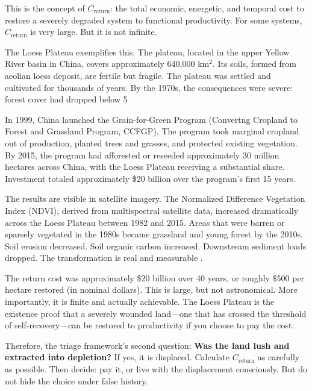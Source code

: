 \documentclass[12pt,a4paper]{article}
\begin{document}
This is the concept of $C_{\text{return}}$: the total economic, energetic, and temporal cost to restore a severely degraded system to functional productivity. For some systems, $C_{\text{return}}$ is very large. But it is not infinite.

The Loess Plateau exemplifies this. The plateau, located in the upper Yellow River basin in China, covers approximately 640,000 km$^2$. Its soils, formed from aeolian loess deposit, are fertile but fragile. The plateau was settled and cultivated for thousands of years. By the 1970s, the consequences were severe: forest cover had dropped below 5%

In 1999, China launched the Grain-for-Green Program (Convertng Cropland to Forest and Grassland Program, CCFGP). The program took marginal cropland out of production, planted trees and grasses, and protected existing vegetation. By 2015, the program had afforested or reseeded approximately 30 million hectares across China, with the Loess Plateau receiving a substantial share. Investment totaled approximately \$20 billion over the program's first 15 years.

The results are visible in satellite imagery. The Normalized Difference Vegetation Index (NDVI), derived from multispectral satellite data, increased dramatically across the Loess Plateau between 1982 and 2015. Areas that were barren or sparsely vegetated in the 1980s became grassland and young forest by the 2010s. Soil erosion decreased. Soil organic carbon increased. Downstream sediment loads dropped. The transformation is real and measurable \citep{Feng:2016, Tucker:1991}.

The return cost was approximately \$20 billion over 40 years, or roughly \$500 per hectare restored (in nominal dollars). This is large, but not astronomical. More importantly, it is finite and actually achievable. The Loess Plateau is the existence proof that a severely wounded land—one that has crossed the threshold of self-recovery—can be restored to productivity if you choose to pay the cost.

Therefore, the triage framework's second question: \textbf{Was the land lush and extracted into depletion?} If yes, it is displaced. Calculate $C_{\text{return}}$ as carefully as possible. Then decide: pay it, or live with the displacement consciously. But do not hide the choice under false history.
\end{document}
